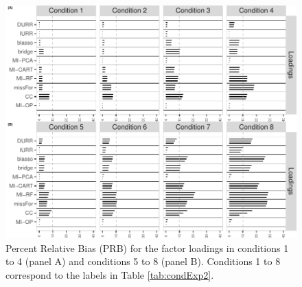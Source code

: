 \begin{figure}
	\includegraphics{../../output/graphs/exp2_CFA_lambda_BPR_summy.pdf}
	\caption{
		Percent Relative Bias (PRB) for the factor loadings in conditions 1 to 4 (panel A) 
		and conditions 5 to 8 (panel B).
		Conditions 1 to 8 correspond to the labels in Table \ref{tab:condExp2}.
		}
\label{fig:exp2fl14}
\end{figure}

\FloatBarrier %

